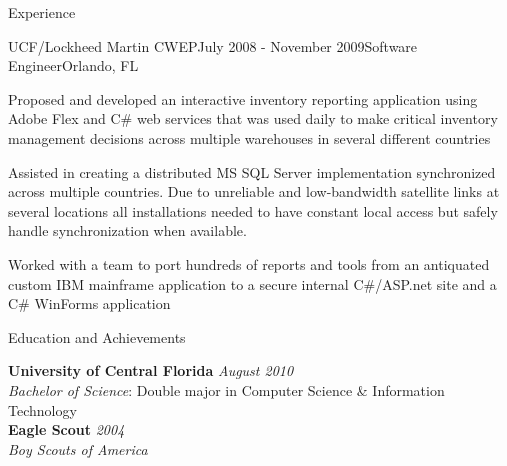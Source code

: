 \documentclass{resume} %
\begin{document}
\begin{rSection}{Experience}
\begin{rSubsection}{UCF/Lockheed Martin CWEP}{July 2008 - November 2009}{Software Engineer}{Orlando, FL}
\item Proposed and developed an interactive inventory reporting application using Adobe Flex and C\# web services that was used daily to make critical inventory management decisions across multiple warehouses in several different countries 
\item Assisted in creating a distributed MS SQL Server implementation synchronized across multiple countries.  Due to unreliable and low-bandwidth satellite links at several locations all installations needed to have constant local access but safely handle synchronization when available. 
\item Worked with a team to port hundreds of reports and tools from an antiquated custom IBM mainframe application to a secure internal C\#/ASP.net site and a C\# WinForms application 

\end{rSubsection}


\end{rSection}


\begin{rSection}{Education and Achievements}

{\bf University of Central Florida} \hfill {\em August 2010} \\ 
\textit{Bachelor of Science}: Double major in Computer Science \& Information Technology \\
{\bf Eagle Scout} \hfill {\em 2004} \\ 
\textit{Boy Scouts of America} \\
\end{rSection}





\end{document}
